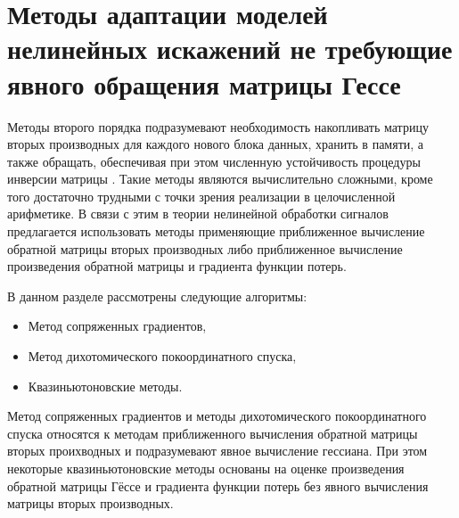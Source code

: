 \section{Методы адаптации моделей нелинейных искажений не требующие явного обращения матрицы Гессе}

Методы второго порядка подразумевают необходимость накопливать матрицу вторых производных для каждого нового блока данных, хранить в памяти, а также обращать, обеспечивая при этом численную устойчивость процедуры инверсии матрицы \cite{matrix_comput}. Такие методы являются вычислительно сложными, кроме того достаточно трудными с точки зрения реализации в целочисленной арифметике. В связи с этим в теории нелинейной обработки сигналов предлагается использовать методы применяющие приближенное вычисление обратной матрицы вторых производных либо приближенное вычисление произведения обратной матрицы и градиента функции потерь.

В данном разделе рассмотрены следующие алгоритмы:
\begin{itemize}
	\item Метод сопряженных градиентов,
	\item Метод дихотомического покоординатного спуска,
	\item Квазиньютоновские методы.
\end{itemize}
Метод сопряженных градиентов и методы дихотомического покоординатного спуска относятся к методам приближенного вычисления обратной матрицы вторых проихводных и подразумевают явное вычисление гессиана. При этом некоторые квазиньютоновские методы основаны на оценке произведения обратной матрицы Гёссе и градиента функции потерь без явного вычисления матрицы вторых производных.

